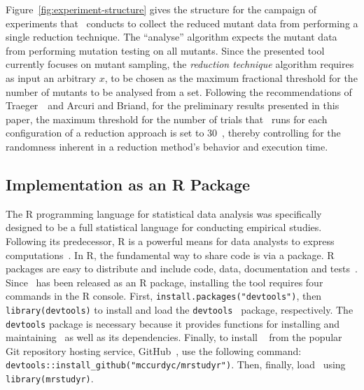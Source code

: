Figure~\ref{fig:experiment-structure} gives the structure for the campaign of experiments that \mr~conducts to collect
the reduced mutant data from performing a single reduction technique. The ``analyse'' algorithm expects the mutant data
from performing mutation testing on all mutants. Since the presented tool currently focuses on mutant sampling, the
\textit{reduction technique} algorithm requires as input an arbitrary $x$, to be chosen as the maximum fractional threshold
for the number of mutants to be analysed from a set. Following the recommendations of Traeger~\etal~and Arcuri and Briand,
for the preliminary results presented in this paper, the maximum threshold for the number of trials that \mr~runs for each
configuration of a reduction approach is set to 30~\cite{traeger2008nine, arcuri2014hitchhiker}, thereby controlling for
the randomness inherent in a reduction method's behavior and execution time.

\subsection{Implementation as an R Package}

The R programming language for statistical data analysis was specifically designed to be a full statistical language for
conducting empirical studies. Following its predecessor, R is a powerful means for data analysts to express
computations~\cite{ihaka1996r}.  In R, the fundamental way to share code is via a package.  R packages are easy to
distribute and include code, data, documentation and tests~\cite{wickham2015r}.  Since \mr~has been released as an R
package, installing the tool requires four commands in the R console.  First, \texttt{install.packages("devtools")},
then {\small\texttt{library(devtools)}} to install and load the {\small\texttt{devtools}}~\cite{devtools} package,
respectively.  The \texttt{devtools} package is necessary because it provides functions for installing and maintaining
\mr~as well as its dependencies.  Finally, to install \mr~\cite{tool} from the popular Git repository hosting service,
GitHub~\cite{github}, use the following command: {\small\texttt{devtools::install\_github("mccurdyc/mrstudyr")}}.  Then,
finally, load \mr~using \texttt{library(mrstudyr)}.


